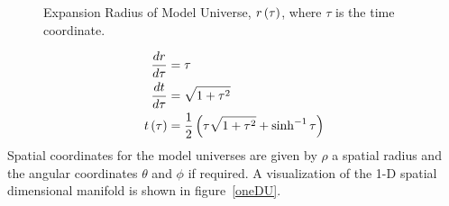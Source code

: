 \begin{figure}[htbp]
\begin{center}
\caption{Expansion Radius of Model Universe, ${r}\left ( {\tau} \right )$, where $\tau$ is the time coordinate.}
\end{center}
\end{figure} 
\begin{align*}
\displaystyle\frac{d{r}}{d{\tau}} &= \tau \\
\displaystyle\frac{d{t}}{d{\tau}} &= \sqrt{1+\tau^{2}} \\
{t}\left ( {\tau} \right ) &= \displaystyle\frac{1}{2}\left ( {\tau\sqrt{1+\tau^{2}}+\sinh^{-1}\tau} \right )
\end{align*}
Spatial coordinates for the model universes are given by $\rho$ a spatial radius and the angular coordinates $\theta$ and $\phi$ if required. A
visualization of the 1-D spatial dimensional manifold is shown in figure~\ref{oneDU}.

